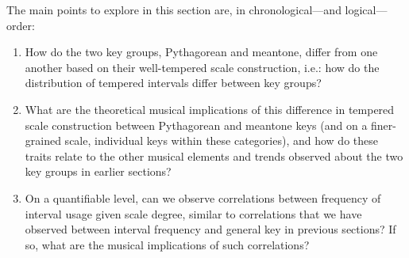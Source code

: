The main points to explore in this section are, in
chronological---and logical---order:

\begin{enumerate}
\def\labelenumi{\arabic{enumi}.}
\tightlist
\item
  How do the two key groups, Pythagorean and meantone, differ from one
  another based on their well-tempered scale construction, i.e.: how do
  the distribution of tempered intervals differ between key groups?
\item
  What are the theoretical musical implications of this difference in
  tempered scale construction between Pythagorean and meantone keys (and
  on a finer-grained scale, individual keys within these categories),
  and how do these traits relate to the other musical elements and
  trends observed about the two key groups in earlier sections?
\item
  On a quantifiable level, can we observe correlations between frequency
  of interval usage given scale degree, similar to correlations that we
  have observed between interval frequency and general key in previous
  sections? If so, what are the musical implications of such
  correlations?
\end{enumerate}

